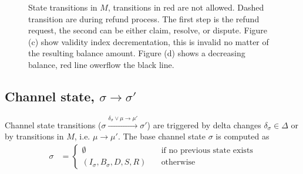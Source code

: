 \documentclass{llncs}
\begin{document}
\begin{figure}[h]
{}
\caption{State transitions in $M$, transitions in red are not allowed. Dashed transition are during refund process. The first step is the refund request, the second can be either claim, resolve, or dispute. Figure (c) show validity index decrementation, this is invalid no matter of the resulting balance amount. Figure (d) shows a decreasing balance, red line owerflow the black line.}
\label{fig:contractStateTransitions}
\end{figure}

\subsection{Channel state, $\sigma \rightarrow \sigma'$} Channel state transitions ($\sigma \xrightarrow{\delta_\sigma \lor \mu \rightarrow \mu'} \sigma'$) are triggered by delta changes $\delta_\sigma \in \Delta$ or by transitions in $M$, i.e. $\mu \rightarrow \mu'$. The base channel state $\sigma$ is computed as
\begin{equation*}
\begin{split}
  \sigma &=
  \begin{cases}
    \emptyset & \quad \text{if no previous state exists} \\
      (I_\sigma, B_\sigma, D, S, R) & \quad \text{otherwise}
  \end{cases}
\end{split}
\end{equation*}
\end{document}
